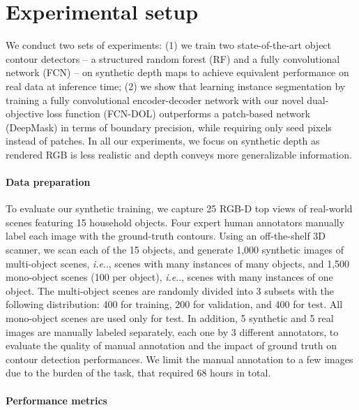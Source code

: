 \documentclass[runningheads,a4paper]{llncs}
\makeatletter
\DeclareRobustCommand\onedot{\futurelet\@let@token\@onedot}
\newcommand*\@onedot{\ifx\@let@token.\else.\null\fi\xspace}
\newcommand*\ie{\emph{i.e}\onedot} \newcommand*\Ie{\emph{I.e}\onedot}
\makeatother
\begin{document}
\section{Experimental setup}
\label{sec:setup}

We conduct two sets of experiments: (1) we train two state-of-the-art object contour detectors -- a structured random forest (RF) \cite{DollarZ14} and a fully convolutional network (FCN) \cite{Yang2016CEDN} -- on synthetic depth maps to achieve equivalent performance on real data at inference time; (2) we show that learning instance segmentation by training a fully convolutional encoder-decoder network with our novel dual-objective loss function (FCN-DOL) outperforms a patch-based network (DeepMask) \cite{SharpMask} in terms of boundary precision, while requiring only seed pixels instead of patches. In all our experiments, we focus on synthetic depth as rendered RGB is less realistic and depth conveys more generalizable information.

\paragraph{Data preparation}

To evaluate our synthetic training, we capture 25 RGB-D top views of real-world scenes featuring 15 household objects. Four expert human annotators manually label each image with the ground-truth contours. Using an off-the-shelf 3D scanner, we scan each of the 15 objects, and generate 1,000 synthetic images of multi-object scenes, \ie, scenes with many instances of many objects, and 1,500 mono-object scenes (100 per object), \ie, scenes with many instances of one object. The multi-object scenes are randomly divided into 3 subsets with the following distribution: 400 for training, 200 for validation, and 400 for test. All mono-object scenes are used only for test. In addition, 5 synthetic and 5 real images are manually labeled separately, each one by 3 different annotators, to evaluate the quality of manual annotation and the impact of ground truth on contour detection performances. We limit the manual annotation to a few images due to the burden of the task, that required 68 hours in total.

\paragraph{Performance metrics}
\end{document}
